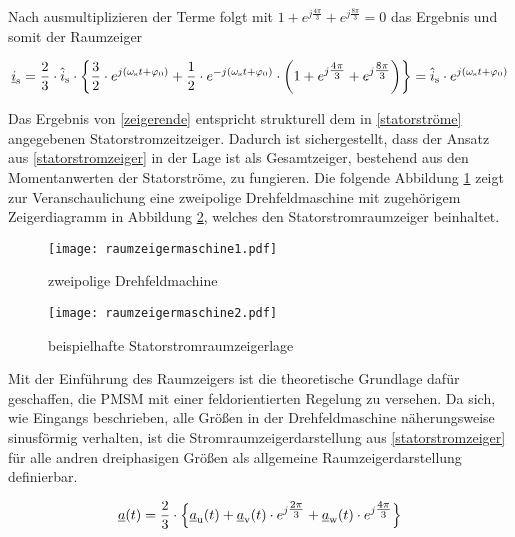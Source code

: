 Nach ausmultiplizieren der Terme folgt mit $1+e^{j\tfrac{4\pi}{3}}+e^{j\tfrac{8\pi}{3}}=0$ das Ergebnis und somit der Raumzeiger

\begin{align}
\begin{split}
	\underline{i}_{\mathrm{s}} = \frac{2}{3} \cdot \hat{i}_{\mathrm{s}}\cdot\biggl\{ \frac{3}{2} \cdot  e^{j(\omega_{\mathrm{s}}t+\varphi_{\mathrm{0}})} + \frac{1}{2} \cdot e^{-j(\omega_{\mathrm{s}}t+\varphi_{\mathrm{0}})} \cdot \bigg( 1+e^{j\tfrac{4\pi}{3}}+e^{j\tfrac{8\pi}{3}} \bigg)  \biggr\} = \hat{i}_{\mathrm{s}} \cdot e^{j(\omega_{\mathrm{s}}t+\varphi_{\mathrm{0}})}
	\label{zeigerende}
\end{split}
\end{align}

Das Ergebnis von \ref{zeigerende} entspricht strukturell dem in \ref{statorströme} angegebenen Statorstromzeitzeiger. 
Dadurch ist sichergestellt, dass der Ansatz aus \ref{statorstromzeiger} in der Lage ist als Gesamtzeiger, bestehend aus den Momentanwerten der Statorströme, zu fungieren. 
Die folgende Abbildung \ref{fig:raumzeigermaschine1} zeigt zur Veranschaulichung eine zweipolige Drehfeldmaschine mit zugehörigem Zeigerdiagramm in Abbildung \ref{fig:raumzeigermaschine2}, welches den Statorstromraumzeiger beinhaltet. 

\begin{figure}[h]
	\centering
	\texttt{[image: raumzeigermaschine1.pdf]}
	\label{fig:raumzeigermaschine1}
	\caption{zweipolige Drehfeldmachine}
\end{figure}

\begin{figure}[h]
	\centering
	\texttt{[image: raumzeigermaschine2.pdf]}
	\label{fig:raumzeigermaschine2}
	\caption{beispielhafte Statorstromraumzeigerlage}
\end{figure}

Mit der Einführung des Raumzeigers ist die theoretische Grundlage dafür geschaffen, die PMSM mit einer feldorientierten Regelung zu versehen. 
Da sich, wie Eingangs beschrieben, alle Größen in der Drehfeldmaschine näherungsweise sinusförmig verhalten, ist die Stromraumzeigerdarstellung aus \ref{statorstromzeiger} für alle andren dreiphasigen Größen als allgemeine Raumzeigerdarstellung definierbar.

\begin{align}
	\underline{a}(t) = \frac{2}{3} \cdot \Bigl\{\underline{a}_{\mathrm{u}}(t) + \underline{a}_{\mathrm{v}}(t)\cdot e^{j\tfrac{2\pi}{3}} + \underline{a}_{\mathrm{w}}(t)\cdot e^{j\tfrac{4\pi}{3}} \Bigr\} \label{raumzeigerdefinition}
\end{align}

